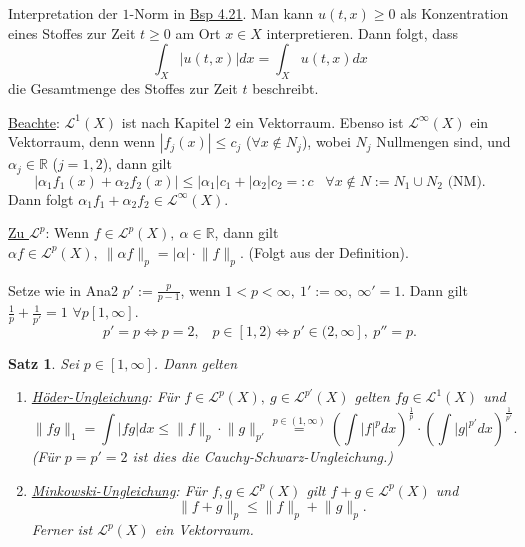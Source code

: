 \documentclass[a4paper]{report}
\newcommand{\R}{\mathbb{R}}
\newcommand{\Leb}{\mathcal{L}}
\newcommand{\jlabel}[1]{\label{j_#1}}
\newcommand{\jhyperref}[2]{\hyperref[j_#1]{#2}}
\newcommand{\jlink}[1]{\jhyperref{#1}{#1}}
\newcommand{\jspace}{\vspace{8pt}}
\newcommand{\jspacesmall}{\vspace{4pt}}
\theoremstyle{plain}
\newtheorem{satz}[thm]{Satz}
\theoremstyle{definition}
\begin{document}
{{{{Interpretation der $1$-Norm in \jlink{Bsp 4.21}. Man kann $u(t,x) \ge 0$ als Konzentration eines Stoffes zur Zeit $t\ge 0$ am Ort $x\in X$ interpretieren. Dann folgt, dass
\[
    \int_X |u(t,x)| dx = \int_X u(t,x) dx
\]
die Gesamtmenge des Stoffes zur Zeit $t$ beschreibt.

\jspace

\uline{Beachte}: $\Leb^1(X)$ ist nach Kapitel 2 ein Vektorraum. Ebenso ist $\Leb^\infty(X)$ ein Vektorraum, denn wenn $|f_j(x)|\le c_j$ ($\forall x \notin N_j$), wobei $N_j$ Nullmengen sind, und $\alpha_j \in \R$ ($j=1,2$), dann gilt
\[
    \tag{$*$}
    |\alpha_1 f_1(x) + \alpha_2 f_2(x)| \le |\alpha_1|c_1 + |\alpha_2| c_2 =: c \hspace{10pt} \forall x \notin N := N_1\cup N_2 \text{ (NM)}.
\]
Dann folgt $\alpha_1 f_1 + \alpha_2 f_2 \in \Leb^\infty(X)$.

\jspacesmall

\uline{Zu $\Leb^p$}: Wenn $f \in \Leb^p(X),\ \alpha \in \R$, dann gilt $\alpha f \in \Leb^p(X),\ \lVert \alpha f \rVert_p = |\alpha|\cdot \lVert f \rVert_p$. (Folgt aus der Definition).

\jspacesmall

Setze wie in Ana2 $p' := \frac{p}{p-1}$, wenn $1<p<\infty,\ 1':= \infty,\ \infty' = 1$. Dann gilt $\frac{1}{p} + \frac{1}{p'} = 1$ $\forall p [1,\infty]$.
\[
    p' = p \Leftrightarrow p = 2, \hspace{10pt} p\in [1,2) \Leftrightarrow p'\in(2,\infty],\ p'' = p.
\]


\begin{satz}
    \jlabel{Satz 5.1}
    Sei $p\in[1,\infty]$. Dann gelten
    \begin{enumerate}
        \item
            \jlabel{Satz 5.1a)}
            \jlabel{Hoelder}
            \uline{Höder-Ungleichung}: Für $f\in \Leb^p(X),\ g\in \Leb^{p'}(X)$ gelten $fg \in \Leb^1(X)$ und 
            \[
                \lVert fg \rVert_1 = \int |fg| dx \le \lVert f \rVert_p \cdot \lVert g \rVert_{p'} \overset{p\in (1,\infty)}{=} \left(\int |f|^p dx \right)^\frac{1}{p} \cdot \left(\int |g|^{p'} dx \right)^\frac{1}{p'}.
            \]
            (Für $p=p' = 2$ ist dies die Cauchy-Schwarz-Ungleichung.)
        \item
            \jlabel{Satz 5.1b)}
            \uline{Minkowski-Ungleichung}: Für $f,g \in \Leb^p(X)$ gilt  $f+g\in \Leb^p(X)$ und
            \[
                \lVert f+g \rVert_p \le \lVert f \rVert_p + \lVert g \rVert_p.
            \]
            Ferner ist $\Leb^p(X)$ ein Vektorraum.
    \end{enumerate}


\end{satz}}}}}
\end{document}
